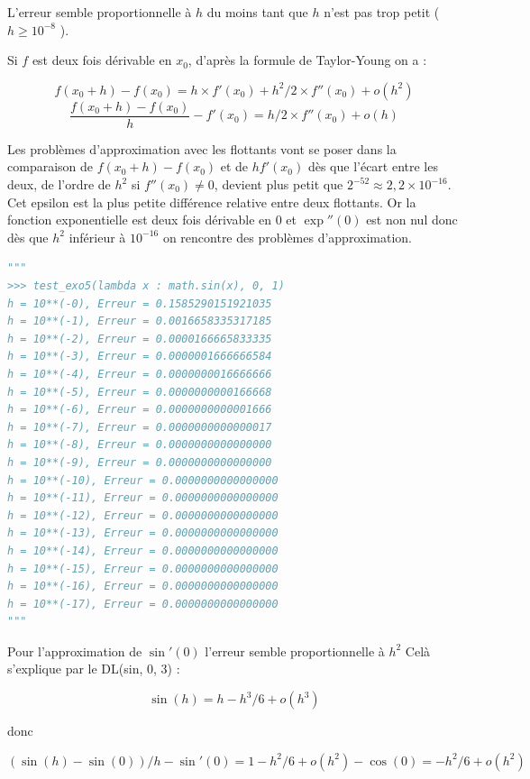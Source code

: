 \documentclass[
  11pt,
]{article}
\newcounter{exo}
\newcounter{prop}
\begin{document}
L'erreur semble proportionnelle à \(h\) du moins tant que \(h\) n'est
pas trop petit ( \(h \geqslant 10^{-8}\) ).

Si \(f\) est deux fois dérivable en \(x_0\), d'après la formule de
Taylor-Young on a :

\[
f(x_0+h) - f(x_0) = h \times f'(x_0) + h^2/2 \times f''(x_0) + o(h^2)
\] \[
\frac{f(x_0+h) - f(x_0)}{h} - f'(x_{0}) = h/2 \times f''(x_0) + o(h)
\]

Les problèmes d'approximation avec les flottants vont se poser dans la
comparaison de \(f(x_0+h) - f(x_0)\) et de \(hf'(x_0)\) dès que l'écart
entre les deux, de l'ordre de \(h^2\) si \(f''(x_0) \neq 0\), devient
plus petit que \(2^{-52} \approx 2,2 \times 10^{-16}\). Cet epsilon est
la plus petite différence relative entre deux flottants. Or la fonction
exponentielle est deux fois dérivable en 0 et \(\exp''(0)\) est non nul
donc dès que \(h^2\) inférieur à \(10^{-16}\) on rencontre des problèmes
d'approximation.

\begin{lstlisting}[language=Python]
"""
>>> test_exo5(lambda x : math.sin(x), 0, 1)
h = 10**(-0), Erreur = 0.1585290151921035
h = 10**(-1), Erreur = 0.0016658335317185
h = 10**(-2), Erreur = 0.0000166665833335
h = 10**(-3), Erreur = 0.0000001666666584
h = 10**(-4), Erreur = 0.0000000016666666
h = 10**(-5), Erreur = 0.0000000000166668
h = 10**(-6), Erreur = 0.0000000000001666
h = 10**(-7), Erreur = 0.0000000000000017
h = 10**(-8), Erreur = 0.0000000000000000
h = 10**(-9), Erreur = 0.0000000000000000
h = 10**(-10), Erreur = 0.0000000000000000
h = 10**(-11), Erreur = 0.0000000000000000
h = 10**(-12), Erreur = 0.0000000000000000
h = 10**(-13), Erreur = 0.0000000000000000
h = 10**(-14), Erreur = 0.0000000000000000
h = 10**(-15), Erreur = 0.0000000000000000
h = 10**(-16), Erreur = 0.0000000000000000
h = 10**(-17), Erreur = 0.0000000000000000
"""
\end{lstlisting}

Pour l'approximation de \(\sin'(0)\) l'erreur semble proportionnelle à
\(h^2\) Celà s'explique par le DL(sin, 0, 3) :

\[\sin(h) = h - h^3/6 + o(h^3)\]

donc

\[(\sin(h) - \sin(0))/h - \sin'(0) = 1 - h^2/6 + o(h^2) - \cos(0)=  -h^2/6 + o(h^2)\]
\end{document}
